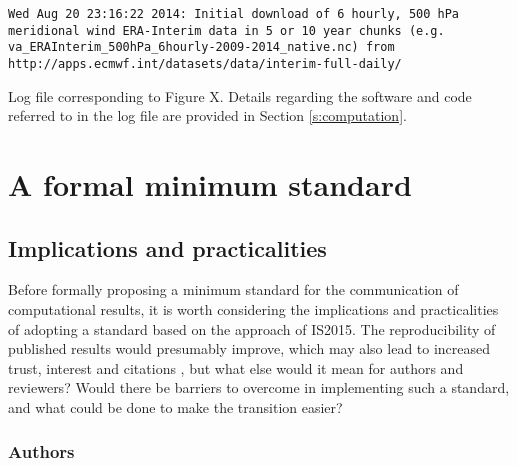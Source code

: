 \begin{featurebox}
\begin{tcolorbox}[width=\textwidth]
\begin{lstlisting}[basicstyle=\footnotesize\ttfamily, breaklines=true]
Wed Aug 20 23:16:22 2014: Initial download of 6 hourly, 500 hPa meridional wind ERA-Interim data in 5 or 10 year chunks (e.g. va_ERAInterim_500hPa_6hourly-2009-2014_native.nc) from http://apps.ecmwf.int/datasets/data/interim-full-daily/
\end{lstlisting}

\end{tcolorbox}

\caption{\label{box:log_file}
Log file corresponding to Figure X. Details regarding the software and code referred to in the log file are provided in Section \ref{s:computation}.}

\end{featurebox}  
 
 

\section{A formal minimum standard}\label{s:reproducibility_standards}

\subsection{Implications and practicalities}

Before formally proposing a minimum standard for the communication of computational results, it is worth considering the implications and practicalities of adopting a standard based on the approach of IS2015. The reproducibility of published results would presumably improve, which may also lead to increased trust, interest and citations \citep{Piwowar2007}, but what else would it mean for authors and reviewers? Would there be barriers to overcome in implementing such a standard, and what could be done to make the transition easier?

\subsubsection{Authors}

